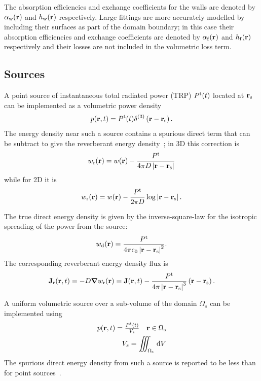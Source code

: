 \documentclass[a4paper]{article}
\numberwithin{equation}{section}
\begin{document}
The absorption efficiencies and exchange coefficients for the walls are denoted 
by $\alpha_{\mathrm{w}}(\boldsymbol{\mathrm{r}})$ and $h_{\mathrm{w}}(\boldsymbol{\mathrm{r}})$ respectively. Large fittings are more
accurately modelled by including their surfaces as part of the domain boundary; in 
this case their absorption efficiencies and exchange coefficients are denoted by
$\alpha_{\mathrm{f}}(\boldsymbol{\mathrm{r}})$ and $h_{\mathrm{f}}(\boldsymbol{\mathrm{r}})$ respectively and their losses are not included in the
volumetric loss term.

\subsection[Sources]{Sources}
\label{sc:sum:src}

A point source of instantaneous total radiated power (TRP) $P^{\mathrm{t}}(t)$
located at $\boldsymbol{\mathrm{r}}_{\mathrm{s}}$ can be implemented as a volumetric power density
\begin{align}
p(\boldsymbol{\mathrm{r}},t) = P^{\mathrm{t}}(t) \delta^{(3)}\left(\boldsymbol{\mathrm{r}}-\boldsymbol{\mathrm{r}}_{\mathrm{s}}\right).
\end{align}
The energy density near such a source contains a spurious direct term that can
be subtract to give the reverberant energy density~\citep{Visentin2012}; in 3D this correction is
\begin{align}
w_{\mathrm{r}}(\boldsymbol{\mathrm{r}}) = w(\boldsymbol{\mathrm{r}}) - \frac{P^{\mathrm{t}}}{4\pi D\left|\boldsymbol{\mathrm{r}}-\boldsymbol{\mathrm{r}}_{\mathrm{s}}\right|}
\end{align}
while for 2D it is
\begin{align}
w_{\mathrm{r}}(\boldsymbol{\mathrm{r}}) = w(\boldsymbol{\mathrm{r}}) - \frac{P^{\mathrm{t}}}{2\pi D} \log \left|\boldsymbol{\mathrm{r}}-\boldsymbol{\mathrm{r}}_{\mathrm{s}}\right|.
\end{align}

The true direct energy density is given by the inverse-square-law for the
isotropic spreading of the power from the source:
\begin{align}
w_{\mathrm{d}}(\boldsymbol{\mathrm{r}}) = \frac{P^{\mathrm{t}}}{4\pi\mathrm{c}_0\left|\boldsymbol{\mathrm{r}}-\boldsymbol{\mathrm{r}}_{\mathrm{s}}\right|^2}.
\end{align}
The corresponding reverberant energy density flux is
\begin{align}
\boldsymbol{\mathrm{J}}_{\mathrm{r}}(\boldsymbol{\mathrm{r}},t) = -D\boldsymbol{\mathrm{\nabla}} w_{\mathrm{r}}(\boldsymbol{\mathrm{r}}) = \boldsymbol{\mathrm{J}}(\boldsymbol{\mathrm{r}},t) - \frac{P^{\mathrm{t}}}{4\pi\left|\boldsymbol{\mathrm{r}}-\boldsymbol{\mathrm{r}}_{\mathrm{s}}\right|^3}\left(\boldsymbol{\mathrm{r}}-\boldsymbol{\mathrm{r}}_{\mathrm{s}}\right).
\end{align}

A uniform volumetric source over a sub-volume of the domain $\Omega_s$ can be implemented
using
\begin{align}
\begin{matrix} 
p(\boldsymbol{\mathrm{r}},t) = \frac{P^{\mathrm{t}}(t)}{V_s} &\boldsymbol{\mathrm{r}}\in\Omega_{\mathrm{s}} 
\end{matrix} \\
V_s = \iiint_{\Omega_{\mathrm{s}}}\,\mathrm{d}{V}
\end{align}
The spurious direct energy density from such a source is reported to be less than for point
sources~\citep{Visentin2012}.
\end{document}
